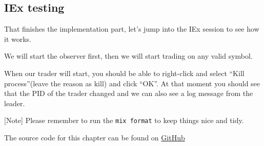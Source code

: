 \documentclass[
  oneside]{book}
\newenvironment{Shaded}{\begin{snugshade}}{\end{snugshade}}
\newcommand{\AttributeTok}[1]{\textcolor[rgb]{0.13,0.29,0.53}{#1}}
\newcommand{\CommentTok}[1]{\textcolor[rgb]{0.56,0.35,0.01}{\textit{#1}}}
\newcommand{\ErrorTok}[1]{\textcolor[rgb]{0.64,0.00,0.00}{\textbf{#1}}}
\newcommand{\ExtensionTok}[1]{#1}
\newcommand{\KeywordTok}[1]{\textcolor[rgb]{0.13,0.29,0.53}{\textbf{#1}}}
\newcommand{\NormalTok}[1]{#1}
\newcommand{\OperatorTok}[1]{\textcolor[rgb]{0.81,0.36,0.00}{\textbf{#1}}}
\newcommand{\PreprocessorTok}[1]{\textcolor[rgb]{0.56,0.35,0.01}{\textit{#1}}}
\newcommand{\SpecialStringTok}[1]{\textcolor[rgb]{0.31,0.60,0.02}{#1}}
\newcommand{\StringTok}[1]{\textcolor[rgb]{0.31,0.60,0.02}{#1}}
\begin{document}
\subsection{IEx testing}\label{iex-testing}

That finishes the implementation part, let's jump into the IEx session to see how it works.

We will start the observer first, then we will start trading on any valid symbol.

When our trader will start, you should be able to right-click and select ``Kill process''(leave the reason as kill) and click ``OK''. At that moment you should see that the PID of the trader changed and we can also see a log message from the leader.

\begin{Shaded}
\end{Shaded}

{[}Note{]} Please remember to run the \texttt{mix\ format} to keep things nice and tidy.

The source code for this chapter can be found on \href{https://github.com/Cinderella-Man/hands-on-elixir-and-otp-cryptocurrency-trading-bot-source-code/tree/chapter_05}{GitHub}
\end{document}
